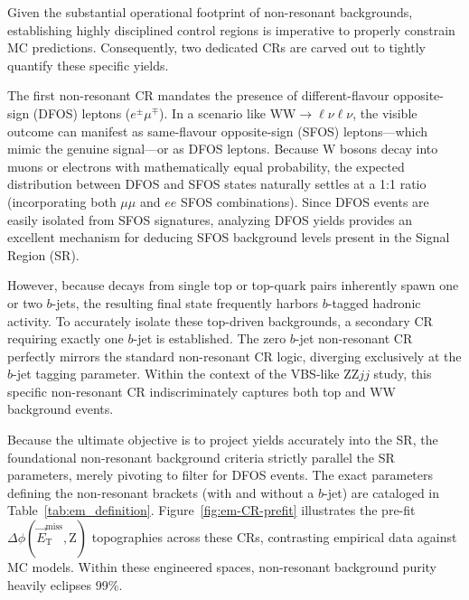 Given the substantial operational footprint of non-resonant backgrounds, establishing highly disciplined control regions is imperative to properly constrain MC predictions. Consequently, two dedicated CRs are carved out to tightly quantify these specific yields. 

The first non-resonant CR mandates the presence of different-flavour opposite-sign (DFOS) leptons ($e^\pm\mu^\mp$). In a scenario like $\text{WW} \to \ell\nu\ell\nu$, the visible outcome can manifest as same-flavour opposite-sign (SFOS) leptons—which mimic the genuine signal—or as DFOS leptons. Because $\text{W}$ bosons decay into muons or electrons with mathematically equal probability, the expected distribution between DFOS and SFOS states naturally settles at a 1:1 ratio (incorporating both $\mu\mu$ and $ee$ SFOS combinations). Since DFOS events are easily isolated from SFOS signatures, analyzing DFOS yields provides an excellent mechanism for deducing SFOS background levels present in the Signal Region (SR). 

However, because decays from single top or top-quark pairs inherently spawn one or two $b$-jets, the resulting final state frequently harbors $b$-tagged hadronic activity. To accurately isolate these top-driven backgrounds, a secondary CR requiring exactly one $b$-jet is established. The zero $b$-jet non-resonant CR perfectly mirrors the standard non-resonant CR logic, diverging exclusively at the $b$-jet tagging parameter. Within the context of the VBS-like $\text{ZZ}jj$ study, this specific non-resonant CR indiscriminately captures both top and $\text{WW}$ background events. 

Because the ultimate objective is to project yields accurately into the SR, the foundational non-resonant background criteria strictly parallel the SR parameters, merely pivoting to filter for DFOS events. The exact parameters defining the non-resonant brackets (with and without a $b$-jet) are cataloged in Table~\ref{tab:em_definition}. Figure~\ref{fig:em-CR-prefit} illustrates the pre-fit $\Delta\phi(\vec{E}_{\text{T}}^{\text{miss}}, \text{Z})$ topographies across these CRs, contrasting empirical data against MC models. Within these engineered spaces, non-resonant background purity heavily eclipses 99\%.

